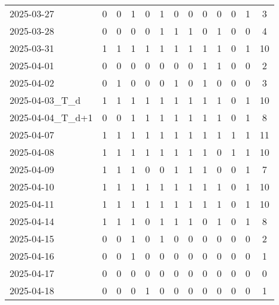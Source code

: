 \documentclass[dvipdfmx,oneside]{article}
\begin{document}
\begin{longtable}{lcccccccccccc}
        2025-03-27 &     0 &     0 &     1 &     0 &     1 &     0 &     0 &     0 &     0 &     0 &     1 &      3 \\
        2025-03-28 &     0 &     0 &     0 &     0 &     1 &     1 &     1 &     0 &     1 &     0 &     0 &      4 \\
        2025-03-31 &     1 &     1 &     1 &     1 &     1 &     1 &     1 &     1 &     1 &     0 &     1 &     10 \\
        2025-04-01 &     0 &     0 &     0 &     0 &     0 &     0 &     0 &     1 &     1 &     0 &     0 &      2 \\
        2025-04-02 &     0 &     1 &     0 &     0 &     0 &     1 &     0 &     1 &     0 &     0 &     0 &      3 \\
  2025-04-03\_T\_d &     1 &     1 &     1 &     1 &     1 &     1 &     1 &     1 &     1 &     0 &     1 &     10 \\
2025-04-04\_T\_d+1 &     0 &     0 &     1 &     1 &     1 &     1 &     1 &     1 &     1 &     0 &     1 &      8 \\
        2025-04-07 &     1 &     1 &     1 &     1 &     1 &     1 &     1 &     1 &     1 &     1 &     1 &     11 \\
        2025-04-08 &     1 &     1 &     1 &     1 &     1 &     1 &     1 &     1 &     0 &     1 &     1 &     10 \\
        2025-04-09 &     1 &     1 &     1 &     0 &     0 &     1 &     1 &     1 &     0 &     0 &     1 &      7 \\
        2025-04-10 &     1 &     1 &     1 &     1 &     1 &     1 &     1 &     1 &     1 &     0 &     1 &     10 \\
        2025-04-11 &     1 &     1 &     1 &     1 &     1 &     1 &     1 &     1 &     1 &     0 &     1 &     10 \\
        2025-04-14 &     1 &     1 &     1 &     0 &     1 &     1 &     1 &     0 &     1 &     0 &     1 &      8 \\
        2025-04-15 &     0 &     0 &     1 &     0 &     1 &     0 &     0 &     0 &     0 &     0 &     0 &      2 \\
        2025-04-16 &     0 &     0 &     1 &     0 &     0 &     0 &     0 &     0 &     0 &     0 &     0 &      1 \\
        2025-04-17 &     0 &     0 &     0 &     0 &     0 &     0 &     0 &     0 &     0 &     0 &     0 &      0 \\
        2025-04-18 &     0 &     0 &     0 &     1 &     0 &     0 &     0 &     0 &     0 &     0 &     0 &      1 \\

\end{longtable}
\end{document}
